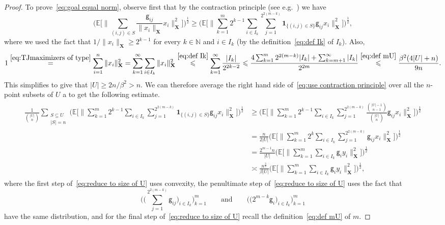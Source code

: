 \documentclass[11pt,reqno]{amsart}
\renewcommand{\le}{\leqslant}
\renewcommand{\ge}{\geqslant}
\newcommand{\X}{\mathbf X}
\theoremstyle{remark}
\renewcommand{\subset}{\subseteq}
\newcommand{\E}{\mathbb{ E}}
\newcommand{\N}{\mathbb N}
\renewcommand{\1}{\mathbf 1}
\newcommand{\g}{\mathsf{g}}
\begin{document}
\begin{proof}
To prove~\eqref{eq:goal equal norm},  observe first that by the contraction principle (see e.g.~\cite[Section~4.2]{LT91}) we have
\begin{equation}\label{eq:use contraction principle}
\Bigg(\E\bigg[\Big\|\sum_{(i,j)\in S} \frac{\g_{ij}}{\|x_i\|_\X}x_i\Big\|_\X^2\bigg]\Bigg)^{\frac12}\ge  \Bigg(\E\bigg[\Big\|\sum_{k=1}^m 2^{k-1} \sum_{i\in I_k} \sum_{j=1}^{2^{2(m-k)}}\1_{\{(i,j)\in S\}} \g_{ij}x_i\Big\|_\X^2\bigg]\Bigg)^{\frac12},
\end{equation}
where we used the fact that $1/\|x_i\|_\X\ge 2^{k-1}$  for every $k\in \N$ and $i\in I_k$ (by the definition~\eqref{eq:def Ik} of $I_k$). Also,
$$
1\stackrel{\eqref{eq:TJmaximizers of type}}{=}\sum_{i=1}^n \|x_i\|_\X^2=\sum_{k=1}^\infty\sum_{i\in I_k} \|x_i\|_\X^2 \stackrel{\eqref{eq:def Ik}}{\le} \sum_{k=1}^\infty \frac{|I_k|}{2^{2k-2}}\le \frac{4\sum_{k=1}^m 2^{2(m-k)}|I_k|+\sum_{k=m+1}^\infty |I_k|}{2^{2m}}\stackrel{\eqref{eq:def mU}}{\le}\frac{\beta^2(4|U|+n)}{9n}.
$$
This simplifies to give that $|U|\ge 2n/\beta^2>n$. We can therefore average the right hand side of~\eqref{eq:use contraction principle} over all the $n$-point subsets of $U$ a to get the following estimate.
\begin{align}\label{eq:reduce to size of U}
\begin{split}
\frac{1}{\binom{|U|}{n}}\sum_{\substack{S\subset U\\ |S|=n}}\Bigg(\E\bigg[\Big\|\sum_{k=1}^m 2^{k-1} \sum_{i\in I_k} \sum_{j=1}^{2^{2(m-k)}}\1_{\{(i,j)\in S\}} \g_{ij}x_i\Big\|_\X^2\bigg]\Bigg)^{\frac12}&\ge \Bigg(\E\bigg[\Big\|\sum_{k=1}^m 2^{k-1} \sum_{i\in I_k} \sum_{j=1}^{2^{2(m-k)}}\frac{\binom{|U|-1}{n-1}}{\binom{|U|}{n}} \g_{ij}x_i\Big\|_\X^2\bigg]\Bigg)^{\frac12}\\
&=\frac{n}{2|U|}\Bigg(\E\bigg[\Big\|\sum_{k=1}^m 2^{k} \sum_{i\in I_k} \sum_{j=1}^{2^{2(m-k)}} \g_{ij}x_i\Big\|_\X^2\bigg]\Bigg)^{\frac12}\\
&=\frac{2^{m-1}n}{|U|} \Bigg(\E\bigg[\Big\|\sum_{k=1}^m\sum_{i\in I_k}\g_{i}  y_i\Big\|_\X^2\bigg]\Bigg)^{\frac12}\\&\asymp\frac{n^{\frac32}}{\beta|U|}\Bigg(\E\bigg[\Big\|\sum_{k=1}^m\sum_{i\in I_k}\g_{i}  y_i\Big\|_\X^2\bigg]\Bigg)^{\frac12},
\end{split}
\end{align}
where the first step of~\eqref{eq:reduce to size of U} uses convexity, the penultimate step of~\eqref{eq:reduce to size of U} uses the fact that
$$
\Bigg(\bigg(\sum_{j=1}^{2^{2(m-k)}} \g_{ij}\bigg)_{i\in I_k}\Bigg)_{k=1}^m \qquad \mathrm{and}\qquad \Big(\big(2^{m-k}\g_i\big)_{i\in I_k}\Big)_{k=1}^m
$$
have the same distribution, and for the final step of~\eqref{eq:reduce to size of U} recall the definition~\eqref{eq:def mU} of $m$.



\end{proof}
\end{document}
